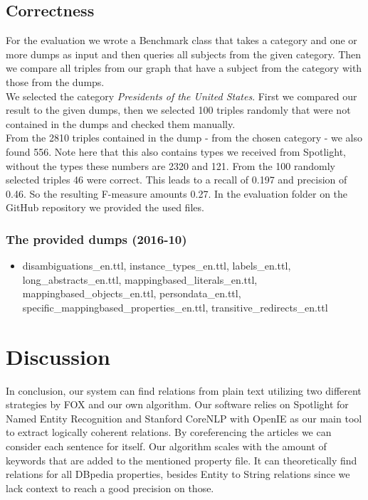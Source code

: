 \documentclass[runningheads]{llncs}
\begin{document}
\subsection{Correctness}
For the evaluation we wrote a Benchmark class that takes a category and one or more dumps as input and then queries all subjects from the given category. Then we compare all triples from our graph that have a subject from the category with those from the dumps. \\

We selected the category \textit{Presidents of the United States}. First we compared our result to the given dumps, then we selected 100 triples randomly that were not contained in the dumps and checked them manually.\\

From the 2810 triples contained in the dump - from the chosen category - we also found 556. Note here that this also contains types we received from Spotlight, without the types these numbers are 2320 and 121. From the 100 randomly selected triples 46 were correct. This leads to a recall 
of 0.197 and precision of 0.46. So the resulting F-measure amounts 0.27. In the evaluation folder on the GitHub repository we provided the used files.
\subsubsection{The provided dumps (2016-10)} 
\begin{itemize} 
	\item disambiguations\_en.ttl, instance\_types\_en.ttl, labels\_en.ttl, long\_abstracts\_en.ttl,
	mappingbased\_literals\_en.ttl, mappingbased\_objects\_en.ttl, persondata\_en.ttl, specific\_mappingbased\_properties\_en.ttl, transitive\_redirects\_en.ttl
\end{itemize}


\section{Discussion}
In conclusion, our system can find relations from plain text utilizing two different strategies by FOX and our own algorithm. Our software relies on Spotlight for Named Entity Recognition and Stanford CoreNLP with OpenIE as our main tool to extract logically coherent relations.
By coreferencing the articles we can consider each sentence for itself. Our algorithm scales with the amount of keywords that are added to the mentioned property file. It can theoretically find relations for all DBpedia properties, besides Entity to String relations since we lack context to reach a good precision on those. \\ 
\end{document}
